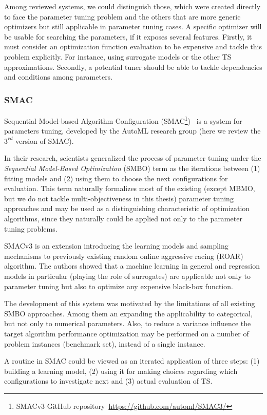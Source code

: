 Among reviewed systems, we could distinguish those, which were created directly to face the parameter tuning problem and the others that are more generic optimizers but still applicable in parameter tuning cases.
A specific optimizer will be usable for searching the parameters, if it exposes several features. Firstly, it must consider an optimization function evaluation to be expensive and tackle this problem explicitly. For instance, using surrogate models or the other TS approximations. Secondly, a potential tuner should be able to tackle dependencies and conditions among parameters.

\subsubsection{SMAC}\label{bg: smac}
Sequential Model-based Algorithm Configuration (SMAC\footnote{SMACv3 GitHub repository~\url{https://github.com/automl/SMAC3/}})~\cite{hutter2011sequential} is a system for parameters tuning, developed by the AutoML research group (here we review the $3^{rd}$ version of SMAC). 

In their research, scientists generalized the process of parameter tuning under the  \emph{Sequential Model-Based Optimization} (SMBO) term as the iterations between (1) fitting models and (2) using them to choose the next configurations for evaluation. 
This term naturally formalizes most of the existing (except MBMO, but we do not tackle multi-objectiveness in this thesis) parameter tuning approaches and may be used as a distinguishing characteristic of optimization algorithms, since they naturally could be applied not only to the parameter tuning problems.

SMACv3 is an extension introducing the learning models and sampling mechanisms to previously existing random online aggressive racing (ROAR) algorithm. The authors showed that a machine learning in general and regression models in particular (playing the role of surrogates) are applicable not only to parameter tuning but also to optimize any expensive black-box function. 

The development of this system was motivated by the limitations of all existing SMBO approaches. Among them an expanding the applicability to categorical, but not only to numerical parameters. Also, to reduce a variance influence the target algorithm performance optimization may be performed on a number of problem instances (benchmark set), instead of a single instance.

A routine in SMAC could be viewed as an iterated application of three steps: (1) building a learning model, (2) using it for making choices regarding which configurations to investigate next and (3) actual evaluation of TS.

